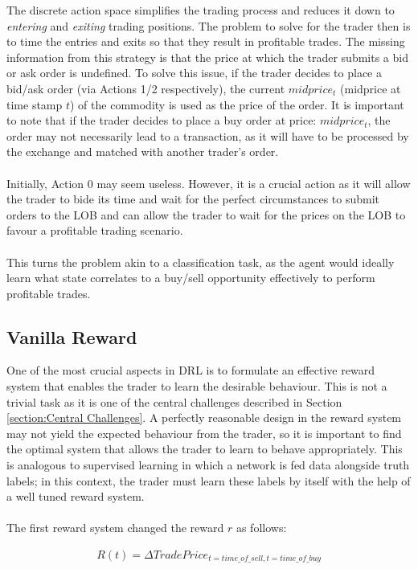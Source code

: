 \documentclass[ %
                    author={Ashwinder Khurana},
                supervisor={Prof Dave Cliff},
                    degree={MEng},
                     title={The Deeply Reinforced Trader},
                  subtitle={},
                      type={enterprise},
                      year={2020} ]{dissertation}
\begin{document}
{\noindent
The discrete action space simplifies the trading process and reduces it down to \textit{entering} and \textit{exiting} trading positions. The problem to solve for the trader then is to time the entries and exits so that they result in profitable trades. 
The missing information from this strategy is that the price at which the trader submits a bid or ask order is undefined. To solve this issue, if the trader decides to place a bid/ask order (via Actions 1/2 respectively), the current $midprice_t$ (midprice at time stamp $t$) of the commodity is used as the price of the order. It is important to note that if the trader decides to place a buy order at price: $midprice_t$, the order may not necessarily lead to a transaction, as it will have to be processed by the exchange and matched with another trader's order. 
\\
\\
Initially, Action 0 may seem useless. However, it is a crucial action as it will allow the trader to bide its time and wait for the perfect circumstances to submit orders to the LOB and can allow the trader to wait for the prices on the LOB to favour a profitable trading scenario.
\\
\\
This turns the problem akin to a classification task, as the agent would ideally learn what state correlates to a buy/sell opportunity effectively to perform profitable trades. 

\subsection{Vanilla Reward}
\label{subsection:Vanilla Reward}
One of the most crucial aspects in DRL is to formulate an effective reward system that enables the trader to learn the desirable behaviour. This is not a trivial task as it is one of the central challenges described in Section \ref{section:Central Challenges}. A perfectly reasonable design in the reward system may not yield the expected behaviour from the trader, so it is important to find the optimal system that allows the trader to learn to behave appropriately. This is analogous to supervised learning in which a network is fed data alongside truth labels; in this context, the trader must learn these labels by itself with the help of a well tuned reward system. 
\\
\\
\noindent
The first reward system changed the reward $r$ as follows: 

\begin{equation}
\label{Vanilla Reward}
\begin{split}
R(t) = \Delta TradePrice_{t=time\_of\_ sell, t=time\_of\_buy}
\end{split}
\end{equation}

}
\end{document}
